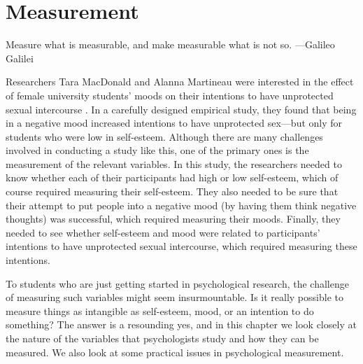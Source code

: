 \chapter{Measurement}

Measure what is measurable, and make measurable what is not so.
---Galileo Galilei


Researchers Tara MacDonald and Alanna Martineau were interested in the effect of female university students' moods on their intentions to have unprotected sexual intercourse \citep{macdonald_self-esteem_2002}. In a carefully designed empirical study, they found that being in a negative mood increased intentions to have unprotected sex—but only for students who were low in self-esteem. Although there are many challenges involved in conducting a study like this, one of the primary ones is the measurement of the relevant variables. In this study, the researchers needed to know whether each of their participants had high or low self-esteem, which of course required measuring their self-esteem. They also needed to be sure that their attempt to put people into a negative mood (by having them think negative thoughts) was successful, which required measuring their moods. Finally, they needed to see whether self-esteem and mood were related to participants' intentions to have unprotected sexual intercourse, which required measuring these intentions.


To students who are just getting started in psychological research, the challenge of measuring such variables might seem insurmountable. Is it really possible to measure things as intangible as self-esteem, mood, or an intention to do something? The answer is a resounding yes, and in this chapter we look closely at the nature of the variables that psychologists study and how they can be measured. We also look at some practical issues in psychological measurement.

